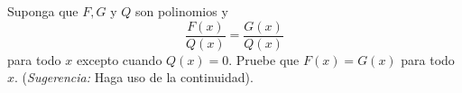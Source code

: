 \item Suponga que $F, G$ y $Q$ son polinomios y
    \[ \frac{F(x)}{Q(x)} = \frac{G(x)}{Q(x)} \]
    para todo $x$ excepto cuando $Q(x) = 0$. Pruebe que $F(x) = G(x)$ para todo $x$. (\textit{Sugerencia:} Haga uso de la continuidad).
